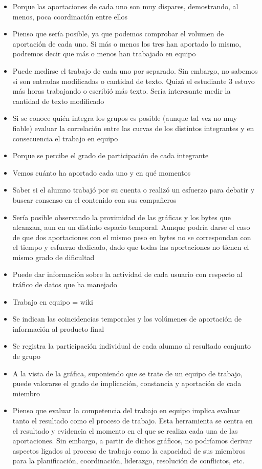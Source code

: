 \begin{itemize}
\item Porque las aportaciones de cada uno son muy dispares, demostrando, al menos, poca coordinación entre ellos
\item Pienso que sería posible, ya que podemos comprobar el volumen de aportación de cada uno. Si más o menos los tres han aportado lo mismo, podremos decir que más o menos han trabajado en equipo
\item Puede medirse el trabajo de cada uno por separado. Sin embargo, no sabemos si son entradas modificadas o cantidad de texto. Quizá el estudiante 3 estuvo más horas trabajando o escribió más texto. Sería interesante medir la cantidad de texto modificado
\item Si se conoce quién integra los grupos es posible (aunque tal vez no muy fiable) evaluar la correlación entre las curvas de los distintos integrantes y en consecuencia el trabajo en equipo
\item Porque se percibe el grado de participación de cada integrante
\item Vemos cuánto ha aportado cada uno y en qué momentos
\item Saber si el alumno trabajó por su cuenta o realizó un esfuerzo para debatir y buscar consenso en el contenido con sus compañeros
\item Sería posible observando la proximidad de las gráficas y los bytes que alcanzan, aun en un distinto espacio temporal. Aunque podría darse el caso de que dos aportaciones con el mismo peso en bytes no se correspondan con el tiempo y esfuerzo dedicado, dado que todas las aportaciones no tienen el mismo grado de dificultad
\item Puede dar información sobre la actividad de cada usuario con respecto al tráfico de datos que ha manejado
\item Trabajo en equipo = wiki
\item Se indican las coincidencias temporales y los volúmenes de aportación de información al producto final
\item Se registra la participación individual de cada alumno al resultado conjunto de grupo
\item A la vista de la gráfica, suponiendo que se trate de un equipo de trabajo, puede valorarse el grado de implicación, constancia y aportación de cada miembro
\item Pienso que evaluar la competencia del trabajo en equipo implica evaluar tanto el resultado como el proceso de trabajo. Esta herramienta se centra en el resultado y evidencia el momento en el que se realiza cada una de las aportaciones. Sin embargo, a partir de dichos gráficos, no podríamos  derivar aspectos ligados al proceso de trabajo como la capacidad de sus miembros para la planificación, coordinación, liderazgo, resolución de conflictos, etc.

\end{itemize}
